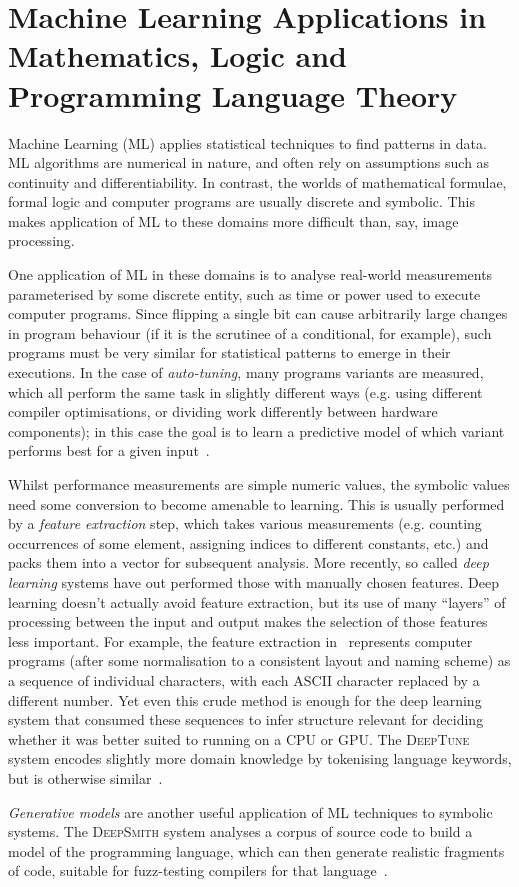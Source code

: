 \section{Machine Learning Applications in Mathematics, Logic and Programming
  Language Theory}

Machine Learning (ML) applies statistical techniques to find patterns in data.
ML algorithms are numerical in nature, and often rely on assumptions such as
continuity and differentiability. In contrast, the worlds of mathematical
formulae, formal logic and computer programs are usually discrete and symbolic.
This makes application of ML to these domains more difficult than, say, image
processing.

One application of ML in these domains is to analyse real-world measurements
parameterised by some discrete entity, such as time or power used to execute
computer programs. Since flipping a single bit can cause arbitrarily large
changes in program behaviour (if it is the scrutinee of a conditional, for
example), such programs must be very similar for statistical patterns to emerge
in their executions. In the case of \emph{auto-tuning}, many programs variants
are measured, which all perform the same task in slightly different ways (e.g.
using different compiler optimisations, or dividing work differently between
hardware components); in this case the goal is to learn a predictive model of
which variant performs best for a given input~\cite{ganapathi2009case}.

Whilst performance measurements are simple numeric values, the symbolic values
need some conversion to become amenable to learning. This is usually performed
by a \emph{feature extraction} step, which takes various measurements (e.g.
counting occurrences of some element, assigning indices to different constants,
etc.) and packs them into a vector for subsequent analysis. More recently, so
called \emph{deep learning} systems have out performed those with manually
chosen features. Deep learning doesn't actually avoid feature extraction, but
its use of many ``layers'' of processing between the input and output makes the
selection of those features less important. For example, the feature extraction
in~\cite{cummins2017synthesizing} represents computer programs (after some
normalisation to a consistent layout and naming scheme) as a sequence of
individual characters, with each ASCII character replaced by a different number.
Yet even this crude method is enough for the deep learning system that consumed
these sequences to infer structure relevant for deciding whether it was better
suited to running on a CPU or GPU. The \textsc{DeepTune} system encodes slightly
more domain knowledge by tokenising language keywords, but is otherwise
similar~\cite{cummins2017end}.

\emph{Generative models} are another useful application of ML techniques to
symbolic systems. The \textsc{DeepSmith} system analyses a corpus of source code
to build a model of the programming language, which can then generate realistic
fragments of code, suitable for fuzz-testing compilers for that
language~\cite{cummins2017deepsmith}.
